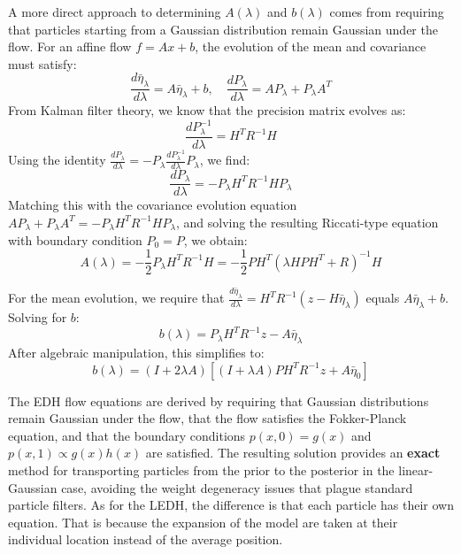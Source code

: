\documentclass{article}
\begin{document}
A more direct approach to determining $A(\lambda)$ and $b(\lambda)$ comes from requiring that particles starting from a Gaussian distribution remain Gaussian under the flow. For an affine flow $f = Ax + b$, the evolution of the mean and covariance must satisfy:
\begin{equation}
\frac{d\bar{\eta}_\lambda}{d\lambda} = A\bar{\eta}_\lambda + b, \quad \frac{dP_\lambda}{d\lambda} = AP_\lambda + P_\lambda A^T
\end{equation}
From Kalman filter theory, we know that the precision matrix evolves as:
\begin{equation}
\frac{dP_\lambda^{-1}}{d\lambda} = H^T R^{-1}H
\end{equation}
Using the identity $\frac{dP_\lambda}{d\lambda} = -P_\lambda \frac{dP_\lambda^{-1}}{d\lambda} P_\lambda$, we find:
\begin{equation}
\frac{dP_\lambda}{d\lambda} = -P_\lambda H^T R^{-1}H P_\lambda
\end{equation}
Matching this with the covariance evolution equation $AP_\lambda + P_\lambda A^T = -P_\lambda H^T R^{-1}H P_\lambda$, and solving the resulting Riccati-type equation with boundary condition $P_0 = P$, we obtain:
\begin{equation}
\boxed{A(\lambda) = -\frac{1}{2}P_\lambda H^T R^{-1}H = -\frac{1}{2}PH^T(\lambda HPH^T + R)^{-1}H}
\end{equation}

For the mean evolution, we require that $\frac{d\bar{\eta}_\lambda}{d\lambda} = H^T R^{-1}(z - H\bar{\eta}_\lambda)$ equals $A\bar{\eta}_\lambda + b$. Solving for $b$:
\begin{equation}
b(\lambda) = P_\lambda H^T R^{-1}z - A\bar{\eta}_\lambda
\end{equation}
After algebraic manipulation, this simplifies to:
\begin{equation}
\boxed{b(\lambda) = (I+2\lambda A)[(I+\lambda A)PH^T R^{-1}z + A\bar{\eta}_0]}
\end{equation}

The EDH flow equations are derived by requiring that Gaussian distributions remain Gaussian under the flow, that the flow satisfies the Fokker-Planck equation, and that the boundary conditions $p(x,0) = g(x)$ and $p(x,1) \propto g(x)h(x)$ are satisfied. The resulting solution provides an \textbf{exact} method for transporting particles from the prior to the posterior in the linear-Gaussian case, avoiding the weight degeneracy issues that plague standard particle filters. As for the LEDH, the difference is that each particle has their own equation. That is because the expansion of the model are taken at their individual location instead of the average position.
\end{document}
